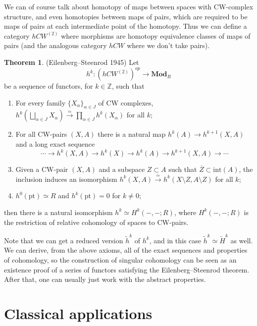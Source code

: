 \documentclass{tufte-handout}
\def\pt {\mathrm{pt}}
\def\Mod {\mathbf{Mod}}
\def\ZZ{\mathbb{Z}}
\theoremstyle{definition}
\newtheorem{theorem}{Theorem}
\begin{document}
We can of course talk about homotopy of maps between spaces with CW-complex structure, and even 
homotopies between maps of pairs, which are required to be maps of pairs at each intermediate point 
of the homotopy. Thus we can define a category $hCW^{(2)}$ where morphisms are homotopy equivalence
classes of maps of pairs (and the analogous category $hCW$ where we don't take pairs).

\begin{theorem}{(Eilenberg--Steenrod 1945)}
Let 
\[
h^k\colon \left(hCW^{(2)}\right)^{op} \to \Mod_R
\]
be a sequence of functors, for $k\in \ZZ$, such that
\begin{enumerate}
\item For every family $\{X_\alpha\}_{\alpha\in J}$ of CW complexes, $h^k(\bigsqcup_{\alpha\in J} X_\alpha) \xrightarrow{\simeq} \prod_{\alpha\in J} h^k(X_\alpha)$ for all $k$;
\item For all CW-pairs $(X,A)$ there is a natural map $h^k(A) \to h^{k+1}(X,A)$ and a long exact sequence
\[
\cdots \to h^k(X,A) \to h^k(X) \to h^k(A) \to h^{k+1}(X,A) \to \cdots
\]
\item Given a CW-pair $(X,A)$ and a subspace $Z\subset A$ such that $\overline{Z} \subset \mathrm{int}(A)$, the inclusion induces an isomorphism $h^k(X,A) \xrightarrow{\simeq} h^k(X\setminus Z,A\setminus Z)$ for all $k$;
\item $h^0(\pt)\simeq R$ and $h^k(\pt) = 0$ for $k\neq 0$;
\end{enumerate}
then there is a natural isomorphism $h^k \simeq H^k(-,-;R)$, where $H^k(-,-;R)$ is the restriction of relative cohomology of spaces to CW-pairs.
\end{theorem}

Note that we can get a reduced version $\widetilde{h}^k$ of $h^k$, and in this case $\widetilde{h}^k\simeq \widetilde{H}^k$ as well.
We can derive, from the above axioms, all of the exact sequences and properties of cohomology, so
the construction of singular cohomology can be seen as an existence proof of a series of functors satisfying
the Eilenberg--Steenrod theorem. After that, one can usually just work with the abstract properties.

\section{Classical applications}
\end{document}
